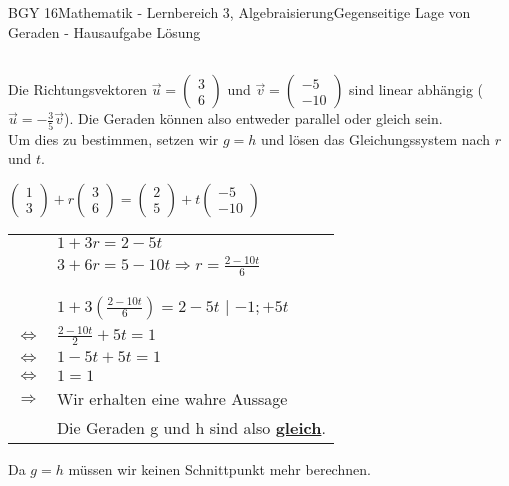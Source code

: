 \documentclass[oneside,openany,headings=optiontotoc,11pt,numbers=noenddot]{scrreprt}
\begin{document}
\begin{worksheet}{BGY 16}{Mathematik - Lernbereich 3, Algebraisierung}{Gegenseitige Lage von Geraden - Hausaufgabe Lösung}
\begin{framed}
\begin{tabularx}{\textwidth}{XX}
			\end{tabularx}
			Die Richtungsvektoren \(\vec{u} = \left(\begin{array}{c}3\\6\end{array}\right)\) und \(\vec{v} = \left(\begin{array}{c}-5\\-10\end{array}\right)\) sind \color{blue}linear abhängig \normalcolor{} (\(\vec{u} = -\frac{3}{5}\vec{v}\)). Die Geraden können also entweder \color{codegreen}parallel\normalcolor{} oder \color{red}gleich\normalcolor{} sein.\\
			Um dies zu bestimmen, setzen wir \(g=h\) und lösen das Gleichungssystem nach \(r\) und \(t\).\\
			\par\noindent
			\par\noindent
			\(\left(\begin{array}{c}1\\3\end{array}\right) + r\left(\begin{array}{c}3\\6\end{array}\right) = \left(\begin{array}{c}2\\5\end{array}\right) + t\left(\begin{array}{c}-5\\-10\end{array}\right)\)
			\begin{center}
				\begin{tabular}{cl}
					&\(1 + 3r = 2 - 5t\)\\
					&\(3 + 6r = 5 - 10t \Rightarrow r = \frac{2 - 10t}{6}\)\\
					\\
					\hline\\
					\par
					&\(1 + 3(\frac{2 - 10t}{6}) = 2 -5t\) | \(-1; +5t\)\\
					\(\Leftrightarrow\) & \(\frac{2 - 10t}{2} + 5t = 1\)\\
					\(\Leftrightarrow\) & \(1 - 5t + 5t = 1\)\\
					\(\Leftrightarrow\) & \(1 = 1\)\\
					\(\Rightarrow\) & Wir erhalten eine wahre Aussage\\
					& Die Geraden g und h sind also \textbf{\underline{gleich}}.
				\end{tabular}				
			\end{center}
			Da \(g=h\) müssen wir keinen Schnittpunkt mehr berechnen.		
		\end{framed}
		

\end{worksheet}
\end{document}
